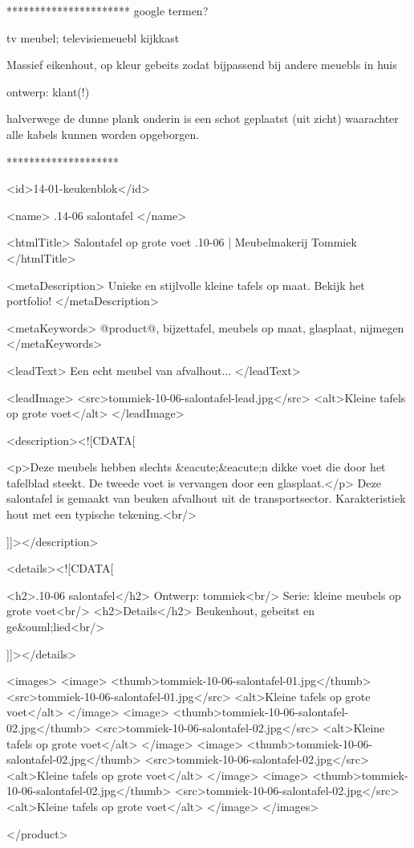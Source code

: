 **********************
google termen?

tv meubel;
televisiemeuebl
kijkkast

Massief eikenhout, op kleur gebeits zodat bijpassend bij andere meuebls in huis

ontwerp: klant(!)

halverwege de dunne plank onderin is een schot geplaatst (uit zicht) waarachter alle kabels kunnen worden opgeborgen.








********************

  <id>14-01-keukenblok</id>
  
  <name>
  .14-06 salontafel
  </name>
  
  <htmlTitle>
  Salontafel op grote voet .10-06 | Meubelmakerij Tommiek
  </htmlTitle>
  
  <metaDescription>
  Unieke en stijlvolle kleine tafels op maat. Bekijk het portfolio!
  </metaDescription>
  
  <metaKeywords>
  @product@, bijzettafel, meubels op maat, glasplaat, nijmegen
  </metaKeywords>
  
  <leadText>
  Een echt meubel van afvalhout...
  </leadText>
  
  <leadImage>
  <src>tommiek-10-06-salontafel-lead.jpg</src>
    <alt>Kleine tafels op grote voet</alt>
  </leadImage>
  
  <description><![CDATA[

    <p>Deze meubels hebben slechts &eacute;&eacute;n dikke voet die door het tafelblad steekt. De tweede voet is vervangen door een glasplaat.</p>
	Deze salontafel is gemaakt van beuken afvalhout uit de transportsector. Karakteristiek hout met een typische tekening.<br/>
	  
  ]]></description>

  <details><![CDATA[
	
	   <h2>.10-06 salontafel</h2>
	   Ontwerp: tommiek<br/>
	   Serie: kleine meubels op grote voet<br/>
	   <h2>Details</h2>
	   Beukenhout, gebeitst en ge&ouml;lied<br/>
	   
  ]]></details>

  <images>
    <image>
      <thumb>tommiek-10-06-salontafel-01.jpg</thumb>
      <src>tommiek-10-06-salontafel-01.jpg</src>
      <alt>Kleine tafels op grote voet</alt>
    </image>
    <image>
      <thumb>tommiek-10-06-salontafel-02.jpg</thumb>
      <src>tommiek-10-06-salontafel-02.jpg</src>
      <alt>Kleine tafels op grote voet</alt>
    </image>
    <image>
      <thumb>tommiek-10-06-salontafel-02.jpg</thumb>
      <src>tommiek-10-06-salontafel-02.jpg</src>
      <alt>Kleine tafels op grote voet</alt>
    </image>
    <image>
      <thumb>tommiek-10-06-salontafel-02.jpg</thumb>
      <src>tommiek-10-06-salontafel-02.jpg</src>
      <alt>Kleine tafels op grote voet</alt>
    </image>
  </images>

</product>